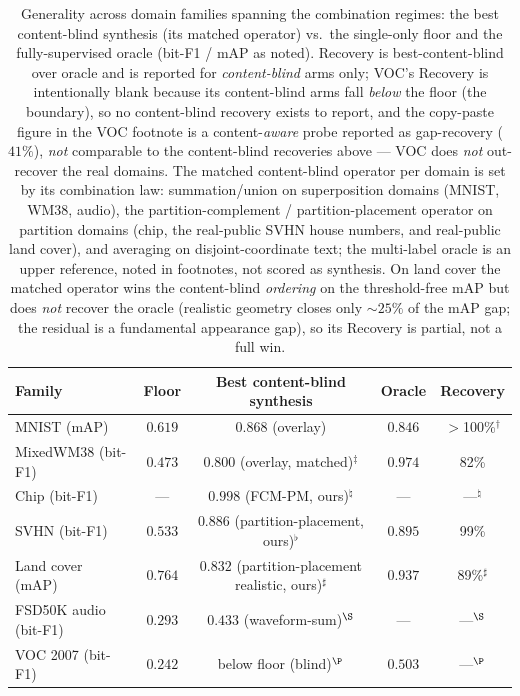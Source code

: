 \documentclass[11pt]{article}
\begin{document}
\begin{table}[t]
\centering
\caption{Generality across domain families spanning the combination regimes: the best
content-blind synthesis (its matched operator) vs.\ the single-only floor and the
fully-supervised oracle (bit-F1 / mAP as noted). Recovery is best-content-blind over
oracle and is reported for \emph{content-blind} arms only; VOC's Recovery is
intentionally blank because its content-blind arms fall \emph{below} the floor (the
boundary), so no content-blind recovery exists to report, and the copy-paste figure in
the VOC footnote is a content-\emph{aware} probe reported as gap-recovery ($41\%$),
\emph{not} comparable to the content-blind recoveries above --- VOC does \emph{not}
out-recover the real domains. The matched content-blind operator per domain is set by its
combination law:
summation/union on superposition domains (MNIST, WM38, audio), the partition-complement /
partition-placement operator on partition domains (chip, the real-public SVHN house numbers,
and real-public land cover), and averaging on disjoint-coordinate text; the multi-label
oracle is an upper reference, noted in footnotes, not scored as synthesis. On land cover the
matched operator wins the content-blind \emph{ordering} on the threshold-free mAP but does
\emph{not} recover the oracle (realistic geometry closes only ${\sim}25\%$ of the mAP gap; the
residual is a fundamental appearance gap), so its Recovery is partial, not a full win.}
\label{tab:families}
\begin{tabular}{lcccc}
\toprule
Family & Floor & Best content-blind synthesis & Oracle & Recovery \\
\midrule
MNIST (mAP)        & $0.619$ & $0.868$ (overlay) & $0.846$ & $>$100\%$^{\dagger}$ \\
MixedWM38 (bit-F1) & $0.473$ & $0.800$ (overlay, matched)$^{\ddagger}$ & $0.974$ & 82\% \\
Chip (bit-F1)      & --- & $0.998$ (FCM-PM, ours)$^{\natural}$ & --- & ---$^{\natural}$ \\
SVHN (bit-F1)      & $0.533$ & $0.886$ (partition-placement, ours)$^{\flat}$ & $0.895$ & 99\% \\
Land cover (mAP) & $0.764$ & $0.832$ (partition-placement realistic, ours)$^{\sharp}$ & $0.937$ & 89\%$^{\sharp}$ \\
FSD50K audio (bit-F1) & $0.293$ & $0.433$ (waveform-sum)$^{\S}$ & --- & ---$^{\S}$ \\
VOC 2007 (bit-F1)  & $0.242$ & below floor (blind)$^{\P}$ & $0.503$ & ---$^{\P}$ \\

\end{tabular}
\end{table}
\end{document}

